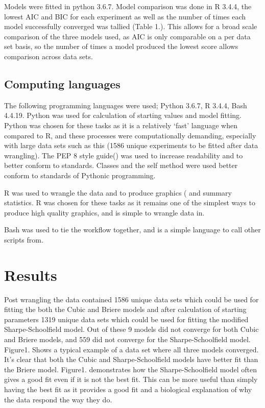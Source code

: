\documentclass[11pt]{article}
\begin{document}
Models were fitted in python 3.6.7. Model comparison was done in R 3.4.4, the lowest AIC and BIC for each experiment as well as the number of times each model successfully converged was tallied (Table 1.). This allows for a broad scale comparison of the three models used, as AIC is only comparable on a per data set basis, so the number of times a model produced the lowest score allows comparison across data sets.

\subsection{Computing languages}
The following programming languages were used; Python 3.6.7, R 3.4.4, Bash 4.4.19. 
Python was used for calculation of starting values and model fitting. Python was chosen for these tasks as it is a relatively ‘fast’ language when compared to R, and these processes were computationally demanding, especially with large data sets such as this (1586 unique experiments to be fitted after data wrangling). The PEP 8 style guide(\cite{PEP82019}) was used to increase readability and to better conform to standards. Classes and the self method were used better conform to standards of Pythonic programming. 

R was used to wrangle the data and to produce graphics (\cite{GGplot2016} and summary statistics. R was chosen for these tasks as it remains one of the simplest ways to produce high quality graphics, and is simple to wrangle data in. 

Bash was used to tie the workflow together, and is a simple language to call other scripts from.

\section{Results }
Post wrangling the data contained 1586 unique data sets which could be used for fitting the both the Cubic and Briere models and after calculation of starting parameters 1319 unique data sets which could be used for fitting the modified Sharpe-Schoolfield model. Out of these 9 models did not converge for both Cubic and Briere models, and 559 did not converge for the Sharpe-Schoolfield model. Figure1. Shows a typical example of a data set where all three models converged.  It’s clear that both the Cubic and Sharpe-Schoolfield models have better fit than the Briere model. Figure1. demonstrates how the Sharpe-Schoolfield model often gives a good fit even if it is not the best fit. This can be more useful than simply having the best fit as it provides a good fit and a biological explanation of why the data respond the way they do.
\end{document}
